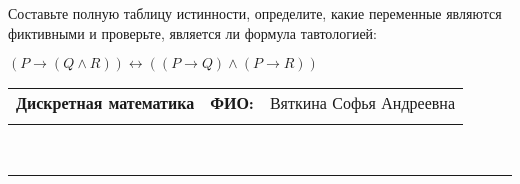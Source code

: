 \documentclass[10pt]{exam}
\newcommand{\class}{Дискретная математика}
\newcommand{\examdate}{}
\begin{document}
\begin{questions}
\begin{enumerate} [a)]
\end{enumerate}\question Составьте полную таблицу истинности, определите, какие переменные являются фиктивными и проверьте, является ли формула тавтологией:

$(P \rightarrow (Q \land R)) \leftrightarrow ((P \rightarrow Q) \land (P \rightarrow R))$

\end{questions}
\newpage
\begin{flushright}
\begin{tabular}{p{2.8in} r l}
\textbf{\class} & \textbf{ФИО:} &Вяткина Софья Андреевна
\\

\textbf{\examdate} &&\\
\end{tabular}\\
\end{flushright}
\rule[1ex]{\textwidth}{.1pt}
\end{document}
